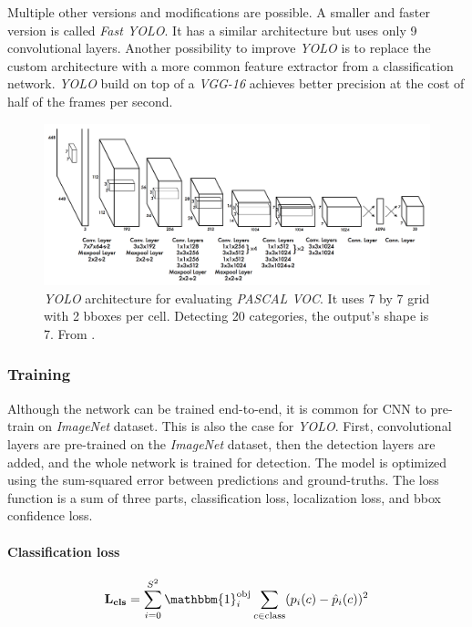 Multiple other versions and modifications are possible. A smaller and faster version is called \textit{Fast YOLO}. It has a similar architecture but uses only 9 convolutional layers. Another possibility to improve \textit{YOLO} is to replace the custom architecture with a more common feature extractor from a classification network. \textit{YOLO} build on top of a \textit{VGG-16} achieves better precision at the cost of half of the frames per second.

\begin{figure}
    \centering
    \includegraphics[width=\textwidth]{img/yoylo}
    \caption{\textit{YOLO} architecture for evaluating \textit{PASCAL VOC}. It uses 7 by 7 grid with 2 bboxes per cell. Detecting 20 categories, the output's shape is 7. From \cite[fig. 3]{bib:yolo}.}
    \label{fig:yolo} 
\end{figure}

\subsubsection{Training}
Although the network can be trained end-to-end, it is common for CNN to pre-train on \textit{ImageNet} dataset. This is also the case for \textit{YOLO}. First, convolutional layers are pre-trained on the \textit{ImageNet} dataset, then the detection layers are added, and the whole network is trained for detection. The model is optimized using the sum-squared error between predictions and ground-truths. The loss function is a sum of three parts, classification loss, localization loss, and bbox confidence loss. 

\paragraph{Classification loss}
\begin{align*}
\mathbf{L_{cls}} = \sum_{i=0}^{S^2}\mathbbm{1}_i^{\text{obj}} \sum_{c\in \text{class}} (p_i(c) - \hat{p}_i(c))^2
\end{align*}

